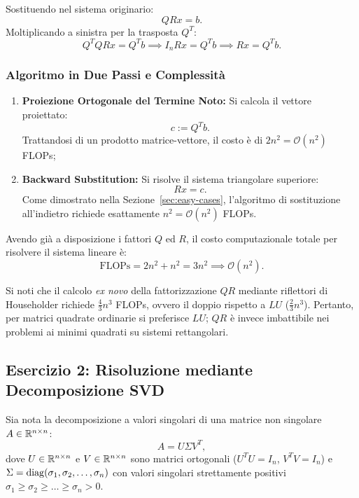 Sostituendo nel sistema originario:
\begin{equation}
    Q R x = b.
\end{equation}
Moltiplicando a sinistra per la trasposta $Q^T$:
\begin{equation}
    Q^T Q R x = Q^T b \implies I_n R x = Q^T b \implies R x = Q^T b.
\end{equation}

\subsubsection{Algoritmo in Due Passi e Complessit\`a}
\begin{enumerate}
    \item \textbf{Proiezione Ortogonale del Termine Noto:} Si calcola il vettore proiettato:
    \begin{equation}
        c := Q^T b.
    \end{equation}
    Trattandosi di un prodotto matrice-vettore, il costo \`e di $2n^2 = \mathcal{O}(n^2)$ FLOPs;
    \item \textbf{Backward Substitution:} Si risolve il sistema triangolare superiore:
    \begin{equation}
        R x = c.
    \end{equation}
    Come dimostrato nella Sezione~\ref{sec:easy-cases}, l'algoritmo di sostituzione all'indietro richiede esattamente $n^2 = \mathcal{O}(n^2)$ FLOPs.
\end{enumerate}

\begin{property}
Avendo gi\`a a disposizione i fattori $Q$ ed $R$, il costo computazionale totale per risolvere il sistema lineare \`e:
\begin{equation}
    \text{FLOPs} = 2n^2 + n^2 = 3n^2 \implies \mathcal{O}(n^2).
\end{equation}
\end{property}
Si noti che il calcolo \textit{ex novo} della fattorizzazione $QR$ mediante riflettori di Householder richiede $\frac{4}{3}n^3$ FLOPs, ovvero il doppio rispetto a $LU$ ($\frac{2}{3}n^3$). Pertanto, per matrici quadrate ordinarie si preferisce $LU$; $QR$ \`e invece imbattibile nei problemi ai minimi quadrati su sistemi rettangolari.

\subsection{Esercizio 2: Risoluzione mediante Decomposizione SVD}
Sia nota la decomposizione a valori singolari di una matrice non singolare $A \in \mathbb{R}^{n \times n}$:
\begin{equation}
    A = U \Sigma V^T,
\end{equation}
dove $U \in \mathbb{R}^{n \times n}$ e $V \in \mathbb{R}^{n \times n}$ sono matrici ortogonali ($U^T U = I_n$, $V^T V = I_n$) e $\Sigma = \operatorname{diag}(\sigma_1, \sigma_2, \dots, \sigma_n)$ con valori singolari strettamente positivi $\sigma_1 \ge \sigma_2 \ge \dots \ge \sigma_n > 0$.

